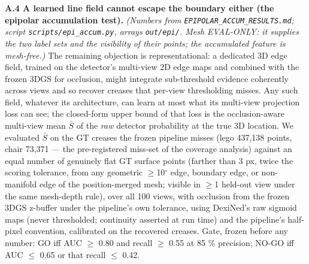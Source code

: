 \textbf{A.4 A learned line field cannot escape the boundary either (the epipolar accumulation
test).} \emph{(Numbers from \texttt{EPIPOLAR\_ACCUM\_RESULTS.md}; script \texttt{scripts/epi\_accum.py},
arrays \texttt{out/epi/}. Mesh EVAL-ONLY: it supplies the two label sets and the visibility
of their points; the accumulated feature is mesh-free.)} The remaining objection is
representational: a dedicated 3D edge field, trained on the detector's multi-view 2D edge
maps and combined with the frozen 3DGS for occlusion, might integrate sub-threshold
evidence coherently across views and so recover creases that per-view thresholding
misses. Any such field, whatever its architecture, can learn at most what its
multi-view projection loss can see; the closed-form upper bound of that loss is the
occlusion-aware multi-view mean $\bar{S}$ of the \emph{raw} detector probability at the true 3D
location. We evaluated $\bar{S}$ on the GT creases the frozen pipeline misses (lego 437,138
points, chair 73,371 --- the pre-registered miss-set of the coverage analysis) against an
equal number of genuinely flat GT surface points (farther than 3 px, twice the scoring
tolerance, from any geometric $\geq$10$^{\circ}$ edge, boundary edge, or non-manifold edge of the
position-merged mesh; visible in $\geq$1 held-out view under the same mesh-depth rule), over
all 100 views, with occlusion from the frozen 3DGS z-buffer under the pipeline's own
tolerance, using DexiNed's raw sigmoid maps (never thresholded; continuity asserted at
run time) and the pipeline's half-pixel convention, calibrated on the recovered creases.
Gate, frozen before any number: GO iff AUC $\geq$ 0.80 and recall $\geq$ 0.55 at 85 \% precision;
NO-GO iff AUC $\leq$ 0.65 or that recall $\leq$ 0.42.

